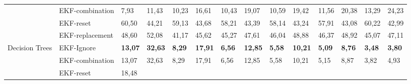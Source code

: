 \documentclass[letterpaper, 10 pt, conference]{ieeeconf}  %
\begin{document}
\begin{table*}[]
\begin{tabular}{@{}llllllllllllll@{}}
	\multicolumn{1}{|l|}{} &
	\multicolumn{1}{l|}{EKF-combination} &
	\multicolumn{1}{l|}{7,93} &
	\multicolumn{1}{l|}{11,43} &
	\multicolumn{1}{l|}{10,23} &
	\multicolumn{1}{l|}{16,61} &
	\multicolumn{1}{l|}{10,43} &
	\multicolumn{1}{l|}{19,07} &
	\multicolumn{1}{l|}{10,59} &
	\multicolumn{1}{l|}{19,42} &
	\multicolumn{1}{l|}{11,56} &
	\multicolumn{1}{l|}{20,38} &
	\multicolumn{1}{l|}{13,29} &
	\multicolumn{1}{l|}{24,23} \\ \cmidrule(l){2-14} 
	\multicolumn{1}{|l|}{} &
	\multicolumn{1}{l|}{EKF-reset} &
	\multicolumn{1}{l|}{60,50} &
	\multicolumn{1}{l|}{44,21} &
	\multicolumn{1}{l|}{59,13} &
	\multicolumn{1}{l|}{43,68} &
	\multicolumn{1}{l|}{58,21} &
	\multicolumn{1}{l|}{43,39} &
	\multicolumn{1}{l|}{58,14} &
	\multicolumn{1}{l|}{43,24} &
	\multicolumn{1}{l|}{57,91} &
	\multicolumn{1}{l|}{43,08} &
	\multicolumn{1}{l|}{60,22} &
	\multicolumn{1}{l|}{42,99} \\ \cmidrule(l){2-14} 
	\multicolumn{1}{|l|}{} &
	\multicolumn{1}{l|}{EKF-replacement} &
	\multicolumn{1}{l|}{48,60} &
	\multicolumn{1}{l|}{52,08} &
	\multicolumn{1}{l|}{41,17} &
	\multicolumn{1}{l|}{45,62} &
	\multicolumn{1}{l|}{45,27} &
	\multicolumn{1}{l|}{47,61} &
	\multicolumn{1}{l|}{46,04} &
	\multicolumn{1}{l|}{48,88} &
	\multicolumn{1}{l|}{46,37} &
	\multicolumn{1}{l|}{48,92} &
	\multicolumn{1}{l|}{45,07} &
	\multicolumn{1}{l|}{47,11} \\ \midrule
	\multicolumn{1}{|l|}{\multirow{4}{*}{Decision Trees}} &
	\multicolumn{1}{l|}{EKF-Ignore} &
	\multicolumn{1}{l|}{\textbf{13,07}} &
	\multicolumn{1}{l|}{\textbf{32,63}} &
	\multicolumn{1}{l|}{\textbf{8,29}} &
	\multicolumn{1}{l|}{\textbf{17,91}} &
	\multicolumn{1}{l|}{\textbf{6,56}} &
	\multicolumn{1}{l|}{\textbf{12,85}} &
	\multicolumn{1}{l|}{\textbf{5,58}} &
	\multicolumn{1}{l|}{\textbf{10,21}} &
	\multicolumn{1}{l|}{\textbf{5,09}} &
	\multicolumn{1}{l|}{\textbf{8,76}} &
	\multicolumn{1}{l|}{\textbf{3,48}} &
	\multicolumn{1}{l|}{\textbf{3,80}} \\ \cmidrule(l){2-14} 
	\multicolumn{1}{|l|}{} &
	\multicolumn{1}{l|}{EKF-combination} &
	\multicolumn{1}{l|}{13,07} &
	\multicolumn{1}{l|}{32,63} &
	\multicolumn{1}{l|}{8,29} &
	\multicolumn{1}{l|}{17,91} &
	\multicolumn{1}{l|}{6,56} &
	\multicolumn{1}{l|}{12,85} &
	\multicolumn{1}{l|}{5,58} &
	\multicolumn{1}{l|}{10,21} &
	\multicolumn{1}{l|}{5,15} &
	\multicolumn{1}{l|}{8,87} &
	\multicolumn{1}{l|}{3,82} &
	\multicolumn{1}{l|}{4,93} \\ \cmidrule(l){2-14} 
	\multicolumn{1}{|l|}{} &
	\multicolumn{1}{l|}{EKF-reset} &
	\multicolumn{1}{l|}{18,48} &

\end{tabular}
\end{table*}
\end{document}
